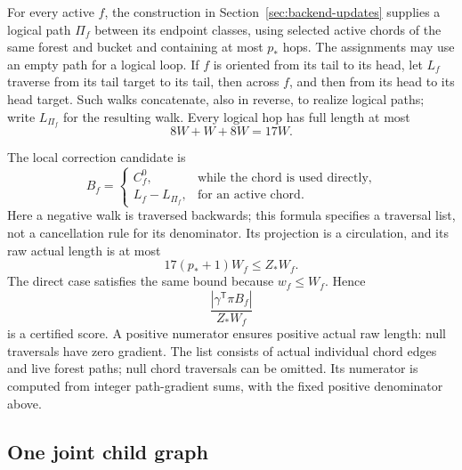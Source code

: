 For every active $f$, the construction in
Section~\ref{sec:backend-updates} supplies a logical path $\Pi_f$
between its endpoint classes, using selected active chords of the
same forest and bucket and containing at most $p_*$ hops.  The
assignments may use an empty path for a logical loop.  If $f$ is
oriented from its tail to its head, let $L_f$ traverse from its tail
target to its tail, then across $f$, and then from its head to its head
target.  Such walks concatenate, also in reverse, to realize logical
paths; write $L_{\Pi_f}$ for the resulting walk.  Every logical hop
has full length at most
\begin{equation}
\label{back:logical-hop}
                         8W+W+8W=17W.
\end{equation}

The local correction candidate is
\begin{equation}
\label{back:correction}
 B_f=\begin{cases}
       C_f^0,&\text{while the chord is used directly},\\
       L_f-L_{\Pi_f},&\text{for an active chord}.
     \end{cases}
\end{equation}
Here a negative walk is traversed backwards; this formula specifies a
traversal list, not a cancellation rule for its denominator.  Its
projection is a circulation, and its raw actual length is at most
\begin{equation}
\label{back:correction-length}
             17(p_*+1)W_f\le Z_*W_f.
\end{equation}
The direct case satisfies the same bound because $w_f\le W_f$.
Hence
\begin{equation}
\label{back:local-score}
                     \frac{|\gamma^{\mathsf T}\pi B_f|}{Z_*W_f}
\end{equation}
is a certified score.  A positive numerator ensures positive actual
raw length: null traversals have zero gradient.  The list consists of
actual individual chord edges and live forest paths; null chord
traversals can be omitted.  Its numerator is computed from integer
path-gradient sums, with the fixed positive denominator above.

\subsection{One joint child graph}
\label{back:child}

